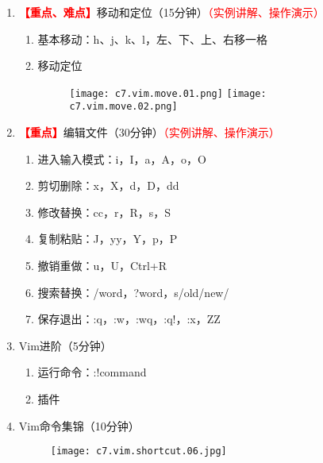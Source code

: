 \documentclass{TIJMUjiaoanLL}
\begin{document}
\begin{enumerate}
  \item \textcolor{red}{\textbf{【重点、难点】}}移动和定位（15分钟）\textcolor{red}{（实例讲解、操作演示）}
    \begin{enumerate}
      \item 基本移动：h、j、k、l，左、下、上、右移一格
      \item 移动定位
    \vspace*{-10pt}
    \begin{figure}[h]
      \centering
      \texttt{[image: c7.vim.move.01.png]}
      \texttt{[image: c7.vim.move.02.png]}
    \end{figure}
    \vspace*{-10pt}

    \end{enumerate}


\otherTail
\newpage
\otherHeader


  \item \textcolor{red}{\textbf{【重点】}}编辑文件（30分钟）\textcolor{red}{（实例讲解、操作演示）}
    \begin{enumerate}
      \item 进入输入模式：i，I，a，A，o，O
      \item 剪切删除：x，X，d，D，dd
      \item 修改替换：cc，r，R，s，S
      \item 复制粘贴：J，yy，Y，p，P
      \item 撤销重做：u，U，Ctrl+R
      \item 搜索替换：/word，?word，s/old/new/
      \item 保存退出：:q，:w，:wq，:q!，:x，ZZ
    \end{enumerate}

  \item Vim进阶（5分钟）
    \begin{enumerate}
      \item 运行命令：:!command
      \item 插件
    \end{enumerate}

  \item Vim命令集锦（10分钟）
    \vspace*{-10pt}
    \begin{figure}[h]
      \centering
      \texttt{[image: c7.vim.shortcut.06.jpg]}
    \end{figure}
    \vspace*{-10pt}


\end{enumerate}
\end{document}
